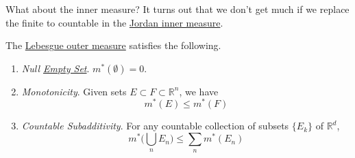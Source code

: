   What about the inner measure? It turns out that we don't get much if we replace the finite to countable in the \hyperref[def:jordan-outer-inner-measure]{Jordan inner measure}. 

  \begin{lemma}
    \label{thm:axiomatic-properties-of-lebesgue-outer-measure}
    The \hyperref[def:lebesgue-outer-measure]{Lebesgue outer measure} satisfies the following. 
    \begin{enumerate}
      \item \textit{Null \hyperref[st-def:empty-set]{Empty Set}}. $m^\ast(\emptyset) = 0$. 
      \item \textit{Monotonicity}. Given sets $E \subset F \subset \mathbb{R}^n$, we have 
      \begin{equation}
        m^\ast (E) \leq m^\ast (F)
      \end{equation}
			\item \textit{Countable Subadditivity}. For any countable collection of subsets $\{E_k\}$ of $\mathbb{R}^d$, 
      \begin{equation}
        m^\ast \bigg( \bigcup_n E_n \bigg) \leq \sum_{n} m^\ast (E_n) 
      \end{equation}
    \end{enumerate}
  \end{lemma}
